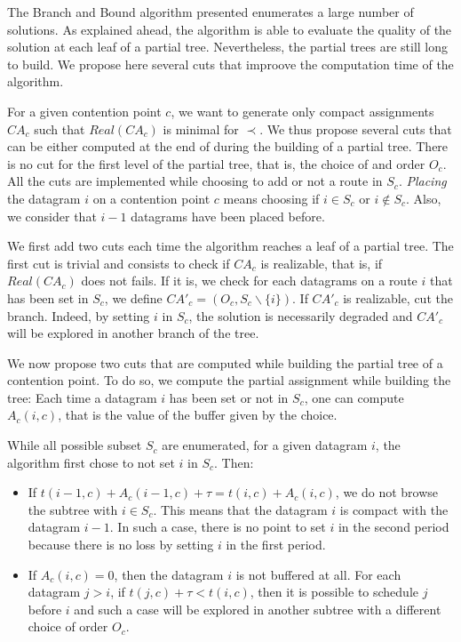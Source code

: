 The Branch and Bound algorithm presented enumerates a large number of solutions. As explained ahead, the algorithm is able to evaluate the quality of the solution at each leaf of a partial tree. Nevertheless, the partial trees are still long to build. We propose here several cuts that improove the computation time of the algorithm.

For a given contention point $c$, we want to generate only compact assignments $CA_c$ such that $Real(CA_c)$ is minimal for $\prec$. We thus propose several cuts that can be either computed at the end of during the building of a partial tree. There is no cut for the first level of the partial tree, that is, the choice of and order $O_c$. All the cuts are implemented while choosing to add or not a route in $S_c$. \textit{Placing} the datagram $i$ on a contention point $c$ means choosing if $i\in S_c$ or $i\notin S_c$. Also, we consider that $i-1$ datagrams have been placed before.


We first add two cuts each time the algorithm reaches a leaf of a partial tree.
The first cut is trivial and consists to check if $CA_c$ is realizable, that is, if $Real(CA_c)$ does not fails.
If it is, we check for each datagrams on a route $i$ that has been set in $S_{c}$, we define $CA'_c = (O_c,S_c\backslash\{i\})$. If $CA'_c$ is realizable, cut the branch. Indeed, by setting $i$ in $S_c$, the solution is necessarily degraded and $CA'_c$ will be explored in another branch of the tree.


We now propose two cuts that are computed while building the partial tree of a contention point. To do so, we compute the partial assignment while building the tree: Each time a datagram $i$ has been set or not in $S_c$, one can compute $A_{c}(i,c)$, that is the value of the buffer given by the choice.

While all possible subset $S_c$ are enumerated, for a given datagram $i$, the algorithm first chose to not set $i$ in $S_c$. Then:
\begin{itemize}
 \item If $t(i-1,c) + A_{c}(i-1,c) + \tau = t(i,c) + A_{c}(i,c)$, we do not browse the subtree with $i \in S_c$. This means that the datagram $i$ is compact with the datagram $i-1$. In such a case, there is no point to set $i$ in the second period because there is no loss by setting $i$ in the first period.

\item If $A_{c}(i,c) = 0$, then the datagram $i$ is not buffered at all. For each datagram $j>i$, if $t(j,c) + \tau < t(i,c)$, then it is possible to schedule $j$ before $i$ and such a case will be explored in another subtree with a different choice of order $O_c$.

\end{itemize}


